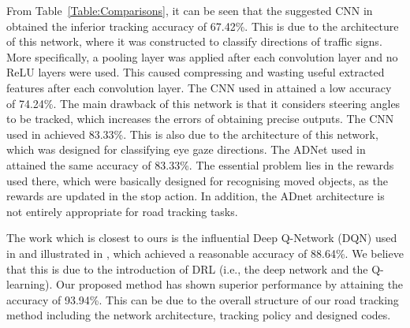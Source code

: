 \documentclass{svproc}
\begin{document}
	From Table~\ref{Table:Comparisons}, it can be seen that the suggested CNN in \cite{Karaduman2017Deep} obtained the inferior tracking accuracy of 67.42\%. This is due to the architecture of this network, where it was constructed to classify directions of traffic signs. More specifically, a pooling layer was applied after each convolution layer and no ReLU layers were used. This caused compressing and wasting useful extracted features after each convolution layer. 
	The CNN used in \cite{bojarski2016end} attained a low accuracy of 74.24\%. The main drawback of this network is that it considers steering angles to be tracked, which increases the errors of obtaining precise outputs. 
	The CNN used in \cite{George2016Real} achieved 83.33\%. This is also due to the architecture of this network, which was designed for classifying eye gaze directions. 
	The ADNet used in \cite{Yun2017Action,Yun2018Action} attained the same accuracy of 83.33\%. The essential problem  lies in the rewards used there, which were basically designed %
	for recognising moved objects, as the rewards are updated in the stop action. In addition, the ADnet architecture is not entirely appropriate for road tracking tasks. 
	
	
	The work which is closest to ours is the influential Deep Q-Network (DQN) used in \cite{mnih2015human} and illustrated in \cite{arulkumaran2017brief}, which achieved a reasonable accuracy of 88.64\%. We believe that this is due to the %
	introduction of DRL (i.e., the deep network and the Q-learning). 
	Our proposed method has shown superior performance by attaining the accuracy of 93.94\%. This can be due to the overall structure of our road tracking method including the network architecture, tracking policy and designed codes.
	
\end{document}
